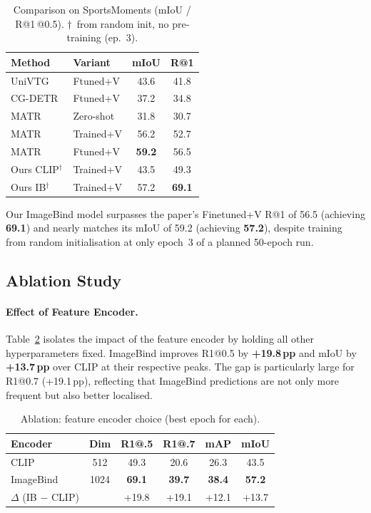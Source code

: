 \documentclass[10pt,twocolumn]{article}
\begin{document}
\begin{table}[h]
  \centering
  \small
  \setlength{\tabcolsep}{4pt}
  \caption{Comparison on SportsMoments (mIoU / R@1\,@0.5).
  $\dagger$~from random init, no pre-training (ep.~3).}
  \label{tab:comparison}
  \begin{tabular}{llcc}
    \toprule
    Method & Variant & mIoU & R@1 \\
    \midrule
    UniVTG~\cite{kumar2025matr}  & Ftuned+V  & 43.6 & 41.8 \\
    CG-DETR~\cite{kumar2025matr} & Ftuned+V  & 37.2 & 34.8 \\
    MATR~\cite{kumar2025matr}    & Zero-shot & 31.8 & 30.7 \\
    MATR~\cite{kumar2025matr}    & Trained+V & 56.2 & 52.7 \\
    MATR~\cite{kumar2025matr}    & Ftuned+V  & \textbf{59.2} & 56.5 \\
    \midrule
    Ours CLIP$^\dagger$          & Trained+V & 43.5 & 49.3 \\
    Ours IB$^\dagger$            & Trained+V & 57.2 & \textbf{69.1} \\
    \bottomrule
  \end{tabular}
\end{table}

Our ImageBind model surpasses the paper's Finetuned+V R@1 of 56.5
(achieving \textbf{69.1}) and nearly matches its mIoU of 59.2
(achieving \textbf{57.2}), despite training from random initialisation
at only epoch~3 of a planned 50-epoch run.

\subsection{Ablation Study}

\paragraph{Effect of Feature Encoder.}
Table~\ref{tab:ablation_encoder} isolates the impact of the feature encoder by
holding all other hyperparameters fixed. ImageBind improves R1@0.5 by
\textbf{+19.8\,pp} and mIoU by \textbf{+13.7\,pp} over CLIP at their
respective peaks. The gap is particularly large for R1@0.7 (+19.1\,pp),
reflecting that ImageBind predictions are not only more frequent but also
better localised.

\begin{table}[h]
  \centering
  \small
  \caption{Ablation: feature encoder choice (best epoch for each).}
  \label{tab:ablation_encoder}
  \begin{tabular}{lccccc}
    \toprule
    Encoder & Dim & R1@.5 & R1@.7 & mAP & mIoU \\
    \midrule
    CLIP~\cite{radford2021clip}         & 512  & 49.3 & 20.6 & 26.3 & 43.5 \\
    ImageBind~\cite{girdhar2023imagebind} & 1024 & \textbf{69.1} & \textbf{39.7} & \textbf{38.4} & \textbf{57.2} \\
    \midrule
    $\Delta$ (IB $-$ CLIP) & & +19.8 & +19.1 & +12.1 & +13.7 \\
    \bottomrule
  \end{tabular}
\end{table}
\end{document}
